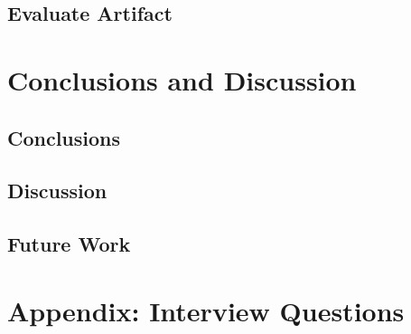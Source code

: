 \documentclass[12pt,
               a4,
               twoside,
               openright]{book} %
\begin{document}
    \section{Evaluate Artifact}
    \label{sec:evaluate}
      
    

    \chapter{Conclusions and Discussion}
    \label{chap:conclusions_discussion}
    
    \section{Conclusions}
    \label{sec:conclusions}
    
    
    \section{Discussion}
    \label{sec:discussion}
    
    
    \section{Future Work}
    \label{sec:future}
    

    \backmatter


%    
%    

%    
%    


    
    

    \appendix
    \chapter{Appendix: Interview Questions}
    \label{appendix:questions}
    


    
    
\end{document}
